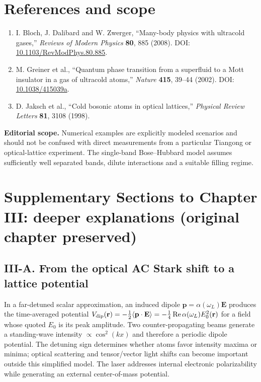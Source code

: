 \documentclass[11pt,a4paper]{article}
\begin{document}
\section{References and scope}
\begin{enumerate}
\item I. Bloch, J. Dalibard and W. Zwerger, ``Many-body physics with ultracold gases,'' \emph{Reviews of Modern Physics} \textbf{80}, 885 (2008). DOI: \href{https://doi.org/10.1103/RevModPhys.80.885}{10.1103/RevModPhys.80.885}.
\item M. Greiner et al., ``Quantum phase transition from a superfluid to a Mott insulator in a gas of ultracold atoms,'' \emph{Nature} \textbf{415}, 39--44 (2002). DOI: \href{https://doi.org/10.1038/415039a}{10.1038/415039a}.
\item D. Jaksch et al., ``Cold bosonic atoms in optical lattices,'' \emph{Physical Review Letters} \textbf{81}, 3108 (1998).
\end{enumerate}
\textbf{Editorial scope.} Numerical examples are explicitly modeled scenarios and should not be confused with direct measurements from a particular Tiangong or optical-lattice experiment. The single-band Bose--Hubbard model assumes sufficiently well separated bands, dilute interactions and a suitable filling regime.

\clearpage
\section*{Supplementary Sections to Chapter III: deeper explanations (original chapter preserved)}
\subsection*{III-A. From the optical AC Stark shift to a lattice potential}
In a far-detuned scalar approximation, an induced dipole $\mathbf p=\alpha(\omega_L)\mathbf E$ produces the time-averaged potential $V_{\rm dip}(\mathbf r)=-\tfrac12\langle\mathbf p\cdot\mathbf E\rangle=-\tfrac14\operatorname{Re}\alpha(\omega_L)E_0^2(\mathbf r)$ for a field whose quoted $E_0$ is its peak amplitude. Two counter-propagating beams generate a standing-wave intensity $\propto\cos^2(kx)$ and therefore a periodic dipole potential. The detuning sign determines whether atoms favor intensity maxima or minima; optical scattering and tensor/vector light shifts can become important outside this simplified model. The laser addresses internal electronic polarizability while generating an external center-of-mass potential.
\end{document}
